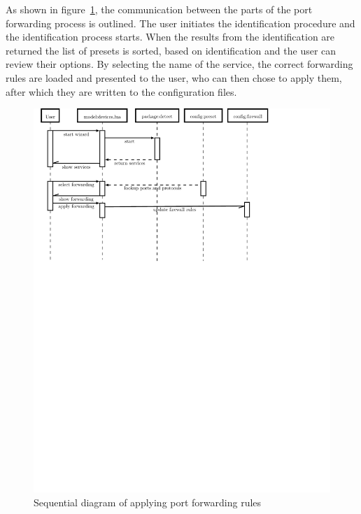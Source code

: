 \documentclass[a4paper,11pt]{kth-bcs}
\begin{document}
As shown in figure~\ref{fig:wizard-seq_dia}, the communication between the parts of the port forwarding process is outlined.
The user initiates the identification procedure and the identification process starts.
When the results from the identification are returned the list of presets is sorted, based on identification and the user can review their options.
By selecting the name of the service, the correct forwarding rules are loaded and presented to the user, who can then chose to apply them, after which they are written to the configuration files.
\begin{figure}[h!]
   \centering
   \includegraphics[width=15cm]{wizard-seq_dia}
   \caption{Sequential diagram of applying port forwarding rules}
   \label{fig:wizard-seq_dia}
\end{figure}
\end{document}
